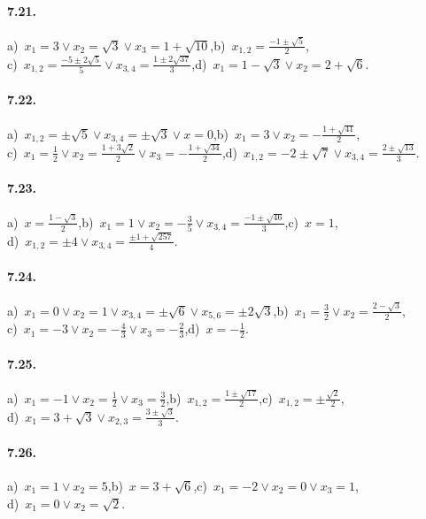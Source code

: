 \paragraph{7.21.} a)~$x_1=3\vee x_2=\sqrt 3\vee x_3=1+\sqrt{10}$,\quad b)~$x_{1,2}=\frac{-1\pm \sqrt 5} 2$,\protect\\
\quad c)~$x_{1,2}=\frac{-5\pm 2\sqrt 5} 5\vee x_{3,4}=\frac{1\pm 2\sqrt{37}} 3$,\quad d)~$x_1=1-\sqrt 3\vee x_2=2+\sqrt 6$.

\paragraph{7.22.} a)~$x_{1,2}=\pm \sqrt 5\vee x_{3,4}=\pm \sqrt 3\vee x=0$,\quad b)~$x_1=3\vee x_2=-\frac{1+\sqrt{41}} 2$,\protect\\
\quad c)~$x_1=\frac 1 2\vee x_2=\frac{1+3\sqrt 2} 2\vee x_3=-\frac{1+\sqrt{34}} 2$,\quad d)~$x_{1,2}=-2\pm \sqrt 7\vee x_{3,4}=\frac{2\pm \sqrt{13}} 3$.

\paragraph{7.23.} a)~$x=\frac{1-\sqrt 3} 2$,\quad b)~$x_1=1\vee x_2=-\frac 3 5\vee x_{3,4}=\frac{-1\pm \sqrt{46}} 3$,\quad c)~$x=1$,\protect\\
\quad d)~$x_{1,2}=\pm 4\vee x_{3,4}=\frac{\pm 1+\sqrt{257}} 4$.

\paragraph{7.24.} a)~$x_1=0\vee x_2=1\vee x_{3,4}=\pm \sqrt 6\vee x_{5,6}=\pm 2\sqrt 3$,\quad b)~$x_1=\frac 3 2\vee x_2=\frac{2-\sqrt 3} 2$,\protect\\
\quad c)~$x_1=-3\vee x_2=-\frac 4 3\vee x_3=-\frac 2 3$,\quad d)~$x=-\frac 1 2$.

\paragraph{7.25.} a)~$x_1=-1\vee x_2=\frac 1 2\vee x_3=\frac 3 2$,\quad b)~$x_{1,2}=\frac{1\pm \sqrt{17}} 2$,\quad c)~$x_{1,2}=\pm \frac{\sqrt 2} 2$,\protect\\
\quad d)~$x_1=3+\sqrt 3\vee x_{2,3}=\frac{3\pm \sqrt 3} 3$.

\paragraph{7.26.} a)~$x_1=1\vee x_2=5$,\quad b)~$x=3+\sqrt 6$,\quad c)~$x_1=-2\vee x_2=0\vee x_3=1$,\protect\\
\quad d)~$x_1=0\vee x_2=\sqrt 2$.

